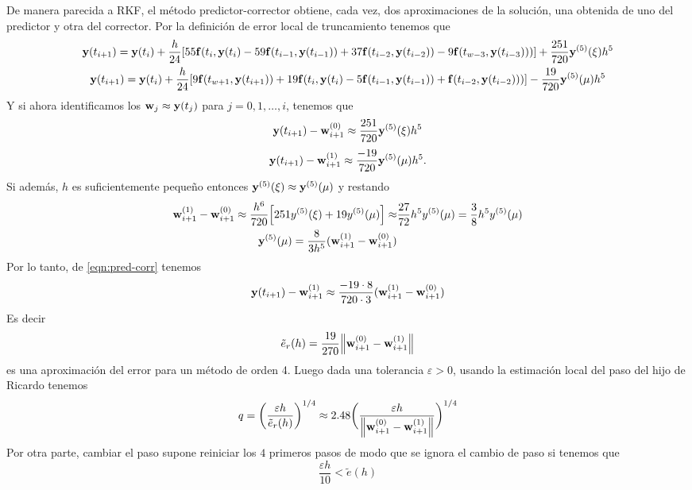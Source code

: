 De manera parecida a RKF, %
el método predictor-corrector obtiene, cada vez,
dos aproximaciones de la solución,
una obtenida de uno del predictor y otra del corrector.
Por la definición de error local de truncamiento tenemos que
\begin{gather*}
    \vb{y}{}(t_{i+1}) = \vb{y}{}(t_i) + \frac{h}{24}[
        55\vb{f}{}(t_i,\vb{y}{}(t_i) - 59\vb{f}{}(t_{i-1},\vb{y}{}(t_{i-1})) + 37\vb{f}{}(t_{i-2}, \vb{y}{}(t_{i-2}))
        - 9\vb{f}{}(t_{w-3},\vb{y}{}(t_{i-3})))
    ] + \frac{251}{720}\vb{y}{}^{(5)}(\xi)h^5  \\
    \vb{y}{}(t_{i+1}) = \vb{y}{}(t_i) + \frac{h}{24}[
        9\vb{f}{}(t_{w+1},\vb{y}{}(t_{i+1})) + 19\vb{f}{}(t_i,\vb{y}{}(t_i) - 5\vb{f}{}(t_{i-1},\vb{y}{}(t_{i-1}))
        + \vb{f}{}(t_{i-2}, \vb{y}{}(t_{i-2})))
    ] - \frac{19}{720}\vb{y}{}^{(5)}(\mu)h^5
\end{gather*}
Y si ahora identificamos los $\vb{w}{}_j \approx \vb{y}{}(t_j)$ para $j = 0,1,\dots, i$,
tenemos que
\begin{equation*} 
    \vb{y}{}(t_{i+1}) - \vb{w}{}_{i+1}^{(0)} \approx {} 
        \frac{251}{720}\vb{y}{}^{(5)}(\xi)h^5
\end{equation*}
\begin{equation} \label{eqn:pred-corr}
    \vb{y}{}(t_{i+1}) - \vb{w}{}_{i+1}^{(1)} \approx {} 
        \frac{-19}{720}\vb{y}{}^{(5)}(\mu)h^5.
\end{equation}
Si además, $h$ es suficientemente pequeño entonces
$\vb{y}{}^{(5)}(\xi) \approx \vb{y}{}^{(5)}(\mu)$
y restando
\begin{align*}
    \vb{w}{}_{i+1}^{(1)} - \vb{w}{}_{i+1}^{(0)} \approx 
        \frac{h^6}{720}\qty[251y^{(5)}(\xi) + 19y^{(5)}(\mu)] \approx &
        \frac{27}{72}h^5y^{(5)}(\mu) = \frac{3}{8}h^5y^{(5)}(\mu) \\
    \vb{y}{}^{(5)}(\mu) = \frac{8}{3h^5}(\vb{w}{}_{i+1}^{(1)} - \vb{w}{}_{i+1}^{(0)}) &
\end{align*}
Por lo tanto, de \ref{eqn:pred-corr} tenemos
\begin{equation*}
    \vb{y}{}(t_{i+1}) - \vb{w}{}_{i+1}^{(1)} \approx \frac{-19 \cdot 8}{720 \cdot 3}(\vb{w}{}_{i+1}^{(1)} - \vb{w}{}_{i+1}^{(0)})
\end{equation*}
Es decir
\begin{equation*}
    \tilde{e}_r(h) = \frac{19}{270}\norm{\vb{w}{}_{i+1}^{(0)} - \vb{w}{}_{i+1}^{(1)}}   
\end{equation*}
es una aproximación del error para un método de orden 4.
Luego dada una tolerancia $\varepsilon > 0$, usando la estimación
local del paso del hijo de Ricardo tenemos
\begin{equation*}
    q = \bigg(\frac{\varepsilon h}{\tilde{e}_r(h)}\bigg)^{1/4} \approx 
        2.48\bigg(\frac{\varepsilon h}{\norm{\vb{w}{}_{i+1}^{(0)} - \vb{w}{}_{i+1}^{(1)}}}\bigg)^{1/4}
\end{equation*}
Por otra parte, cambiar el paso supone reiniciar los
$4$ primeros pasos de modo que se ignora el cambio de paso 
si tenemos que 
\begin{equation*}
    \frac{\varepsilon h}{10} < \tilde{e}(h)
\end{equation*}
